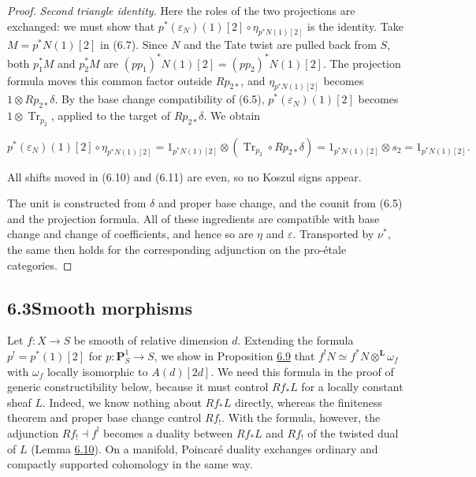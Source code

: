 \documentclass[11pt]{article}
\begin{document}
\begin{proof}[{Proof}]
\emph{Second triangle identity.} Here the roles of the two projections are exchanged: we must show that \(p^*(\varepsilon_N)(1)[2]\circ\eta_{p^*N(1)[2]}\) is the identity. Take \(M=p^*N(1)[2]\) in (6.7). Since \(N\) and the Tate twist are pulled back from \(S\), both \(p_1^*M\) and \(p_2^*M\) are \((pp_1)^*N(1)[2]=(pp_2)^*N(1)[2]\). The projection formula moves this common factor outside \(Rp_{2*}\), and \(\eta_{p^*N(1)[2]}\) becomes \(1\otimes Rp_{2*}\delta\). By the base change compatibility of (6.5), \(p^*(\varepsilon_N)(1)[2]\) becomes \(1\otimes\operatorname{Tr}_{p_2}\), applied to the target of \(Rp_{2*}\delta\). We obtain

\[
p^*(\varepsilon_N)(1)[2]\circ\eta_{p^*N(1)[2]}
=1_{p^*N(1)[2]}\otimes
(\operatorname{Tr}_{p_2}\circ Rp_{2*}\delta)
=1_{p^*N(1)[2]}\otimes s_2=1_{p^*N(1)[2]}.
\tag{6.11}
\]

All shifts moved in (6.10) and (6.11) are even, so no Koszul signs appear.

The unit is constructed from \(\delta\) and proper base change, and the counit from (6.5) and the projection formula. All of these ingredients are compatible with base change and change of coefficients, and hence so are \(\eta\) and \(\varepsilon\). Transported by \(\nu^*\), the same then holds for the corresponding adjunction on the pro-étale categories.
\end{proof}


\subsection*{\texorpdfstring{6.3\quad Smooth morphisms}{6.3 Smooth morphisms}}
\label{bp536}%
\label{bp537}%
Let \(f:X\to S\) be smooth of relative dimension \(d\). Extending the formula \(p^!=p^*(1)[2]\) for \(p:\mathbf P^1_S\to S\), we show in Proposition \hyperref[bp542]{6.9} that \(f^!N\simeq f^*N\otimes^{\mathbf L}\omega_f\) with \(\omega_f\) locally isomorphic to \(A(d)[2d]\). We need this formula in the proof of generic constructibility below, because it must control \(Rf_*L\) for a locally constant sheaf \(L\). Indeed, we know nothing about \(Rf_*L\) directly, whereas the finiteness theorem and proper base change control \(Rf_!\). With the formula, however, the adjunction \(Rf_!\dashv f^!\) becomes a duality between \(Rf_*L\) and \(Rf_!\) of the twisted dual of \(L\) (Lemma \hyperref[bp545]{6.10}). On a manifold, Poincaré duality exchanges ordinary and compactly supported cohomology in the same way.
\end{document}
